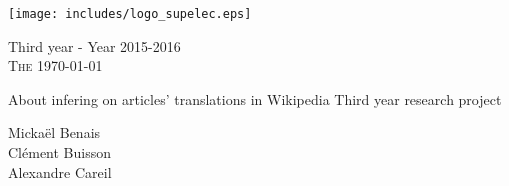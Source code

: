 \makeatletter
\begin{minipage}{1\textwidth}
  \centering 

  \begin{flushleft}
    \texttt{[image: includes/logo\_supelec.eps]}
    \newline

    Third year - Year 2015-2016 \\
    \textsc{The \today}
  \end{flushleft}
  
  \vskip 6cm
  {\LARGE\textsc About infering on articles' translations in Wikipedia }
  \vskip 0.5cm
  {\LARGE\textsc Third year research project}
  \vskip 6cm

  \Large{ Mickaël Benais\\
    Clément Buisson\\
    Alexandre Careil
}
\end{minipage}
\thispagestyle{empty}
\makeatother